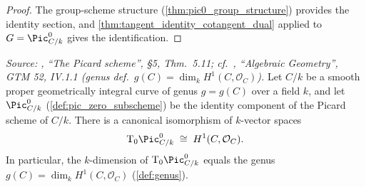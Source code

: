 \begin{proof}\leanok
  The group-scheme structure (\cref{thm:pic0_group_structure})
  provides the identity section, and
  \cref{thm:tangent_identity_cotangent_dual} applied to
  \(G = \Pic^0_{C/k}\) gives the identification.
\end{proof}


\begin{theorem}\leanok
  \label{thm:pic0_tangent_space_iso}

  \textit{Source: \cite{kleiman-picard}, ``The Picard scheme'', \S 5,
  Thm.~5.11; cf.\ \cite{hartshorne-ag}, ``Algebraic Geometry'', GTM 52,
  IV.1.1 (genus def.\ \(g(C) = \dim_k H^1(C, \mathcal{O}_C)\)).}
  Let \(C/k\) be a smooth proper geometrically integral curve of genus
  \(g = g(C)\) over a field \(k\), and let \(\Pic^0_{C/k}\)
  (\cref{def:pic_zero_subscheme}) be the identity component of the
  Picard scheme of \(C/k\). There is a canonical isomorphism of
  \(k\)-vector spaces
  \[
    \tu T_0 \Pic^0_{C/k} \;\cong\; H^1(C, \mathcal{O}_C).
  \]
  In particular, the \(k\)-dimension of \(\tu T_0 \Pic^0_{C/k}\) equals
  the genus \(g(C) = \dim_k H^1(C, \mathcal{O}_C)\)
  (\cref{def:genus}).
\end{theorem}

